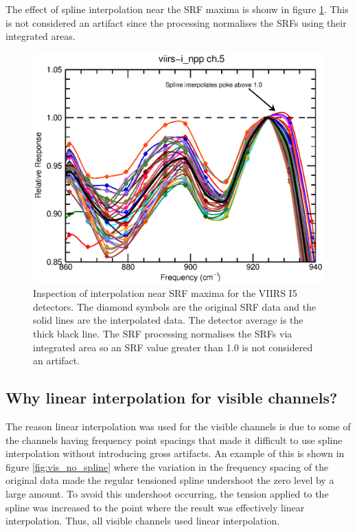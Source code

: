 The effect of spline interpolation near the SRF maxima is shonw in figure \ref{fig:high_level_interp}. This is not considered an artifact since the processing normalises the SRFs using their integrated areas.

\begin{figure}[H]
  \centering
  \includegraphics[bb= 0 15 400 300,clip,scale=0.75]{graphics/viirs-i_npp-ch5_interp2.eps}
  \caption{Inspection of interpolation near SRF maxima for the VIIRS I5 detectors. The diamond symbols are the original SRF data and the solid lines are the interpolated data. The detector average is the thick black line. The SRF processing normalises the SRFs via integrated area so an SRF value greater than 1.0 is not considered an artifact.}
  \label{fig:high_level_interp}
\end{figure}

\subsection{Why linear interpolation for visible channels?}
The reason linear interpolation was used for the visible channels is due to some of the channels having frequency point spacings that made it difficult to use spline interpolation without introducing gross artifacts. An example of this is shown in figure \ref{fig:vis_no_spline} where the variation in the frequency spacing of the original data made the regular tensioned spline undershoot the zero level by a large amount. To avoid this undershoot occurring, the tension applied to the spline was increased to the point where the result was effectively linear interpolation. Thus, all visible channels used linear interpolation.

